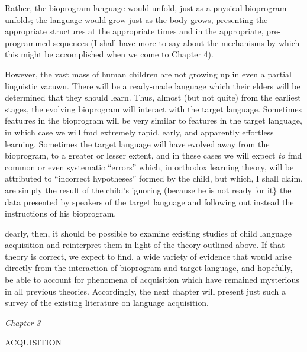 Rather, the bioprogram language would unfold, just as a pnysical bioprogram unfolds; the language would grow just as the body grows, presenting the appropriate structures at the appropriate times and in the appropriate, pre-programmed sequences (I shall have more to say about the mechanisms by which this might be accomplished when we come to Chapter 4).

However, the vast mass of human children are not growing up in even a partial linguistic vacuwn. There will be a ready-made language which their elders will be determined that they should learn. Thus, almost (but not quite) from the earliest stages, the evolving bioprogram will interact with the target language. Sometimes featu:res in the bio\-program will be very similar to features in the target language, in which case we will fmd extremely rapid, early, and apparently effortless learning. Sometimes the target language will have evolved away from the bioprogram, to a greater or lesser extent, and in these cases we will expect \textit{to} fmd common or even systematic ``errors'' which, in orthodox learning theory, will be attributed to ``incorrect hypotheses'' formed by the child, but which, I shall claim, are simply the result of the child's ignoring (because he is not ready for it\} the data presented by speakers of the target language and following out instead the instruc\-tions of his bioprogram.

dearly, then, it should be possible to examine existing studies of child language acquisition and reinterpret them in light of the theory outlined above. If that theory is correct, we expect to find. a wide variety of evidence that would arise directly from the interaction of bioprogram and target language, and hopefully, be able to account for phenomena of acquisition which have remained mysterious in all previous theories. Accordingly, the next chapter will present just such a survey of the existing literature on language acquisition.


\textit{Chapter} \textit{3}

ACQUISITION

